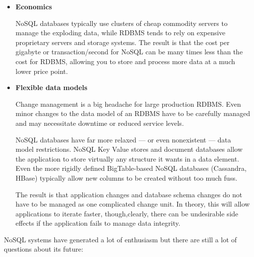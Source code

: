 \begin{itemize}
\item \textbf{Economics}

NoSQL databases typically use clusters of cheap commodity servers to manage the exploding data, while RDBMS tends to rely on expensive proprietary servers and storage systems. The result is that the cost per gigabyte or transaction/second for NoSQL can be many times less than the cost for RDBMS, allowing you to store and process more data at a much lower price point.


\item \textbf{Flexible data models}

Change management is a big headache for large production RDBMS. Even minor changes to the data model of an RDBMS have to be carefully managed and may necessitate downtime or reduced service levels.

NoSQL databases have far more relaxed — or even nonexistent — data model restrictions. NoSQL Key Value stores and document databases allow the application to store virtually any structure it wants in a data element. Even the more rigidly defined BigTable-based NoSQL databases (Cassandra, HBase) typically allow new columns to be created without too much fuss.

The result is that application changes and database schema changes do not have to be managed as one complicated change unit. In theory, this will allow applications to iterate faster, though,clearly, there can be undesirable side effects if the application fails to manage data integrity.

\end{itemize}


NoSQL systems have generated a lot of enthusiasm but there are still a lot of questions about its future:

